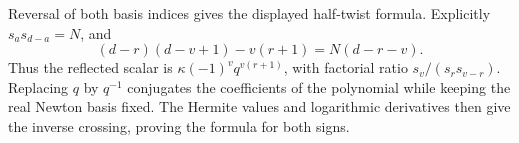 Reversal of both basis indices gives the displayed half-twist formula.
Explicitly $s_a s_{d-a}=N$, and
\[
 (d-r)(d-v+1)-v(r+1)=N(d-r-v).
\]
Thus the reflected scalar is $\kappa(-1)^v q^{v(r+1)}$, with
factorial ratio $s_v/(s_rs_{v-r})$. Replacing $q$ by $q^{-1}$
conjugates the coefficients of the polynomial while keeping the real
Newton basis fixed. The Hermite values and logarithmic derivatives
then give the inverse crossing, proving the formula for both signs.

